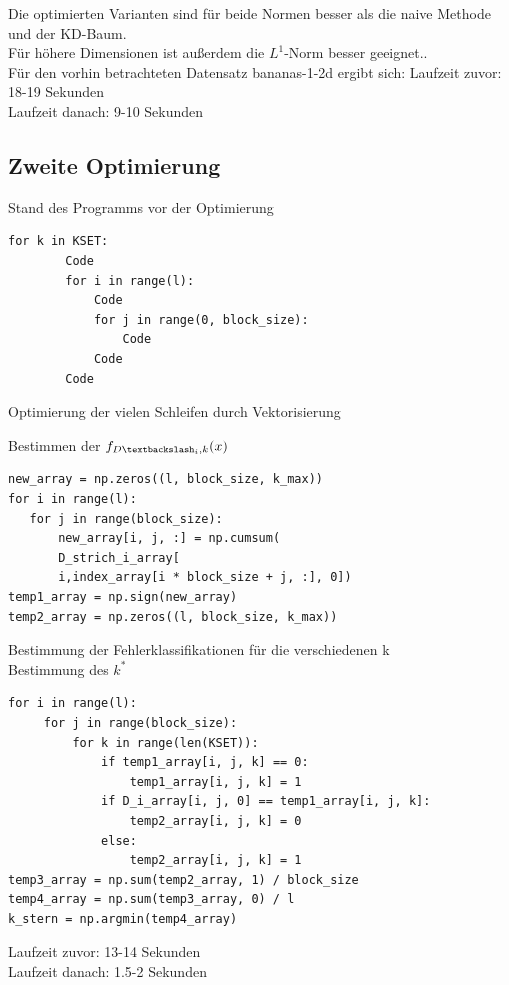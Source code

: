 \documentclass{beamer}
\begin{document}
\begin{frame}
Die optimierten Varianten sind für beide Normen besser als die naive Methode und der KD-Baum.\\
Für höhere Dimensionen ist außerdem die $L^1$-Norm besser geeignet..\\
Für den vorhin betrachteten Datensatz bananas-1-2d ergibt sich:
Laufzeit zuvor: 18-19 Sekunden\\
Laufzeit danach: 9-10 Sekunden
\end{frame}

\subsection{Zweite Optimierung}

\begin{frame}[fragile]
Stand des Programms vor der Optimierung
\begin{verbatim}
for k in KSET:
        Code
        for i in range(l):
            Code
            for j in range(0, block_size):
                Code
            Code
        Code
\end{verbatim}
Optimierung der vielen Schleifen durch Vektorisierung
\end{frame}

\begin{frame}[fragile]
Bestimmen der $f_{D \textbackslash _i,k} (x)$
\begin{verbatim}
new_array = np.zeros((l, block_size, k_max))  
for i in range(l):
   for j in range(block_size):
       new_array[i, j, :] = np.cumsum(
       D_strich_i_array[
       i,index_array[i * block_size + j, :], 0])
temp1_array = np.sign(new_array)
temp2_array = np.zeros((l, block_size, k_max))
\end{verbatim}
\end{frame}


\begin{frame}[fragile]
Bestimmung der Fehlerklassifikationen für die verschiedenen k\\
Bestimmung des $k^*$
\begin{verbatim}
for i in range(l):
     for j in range(block_size):
         for k in range(len(KSET)):
             if temp1_array[i, j, k] == 0:
                 temp1_array[i, j, k] = 1
             if D_i_array[i, j, 0] == temp1_array[i, j, k]:
                 temp2_array[i, j, k] = 0
             else:
                 temp2_array[i, j, k] = 1
temp3_array = np.sum(temp2_array, 1) / block_size
temp4_array = np.sum(temp3_array, 0) / l
k_stern = np.argmin(temp4_array)
\end{verbatim}
Laufzeit zuvor: 13-14 Sekunden\\
Laufzeit danach: 1.5-2 Sekunden
\end{frame}
\end{document}
